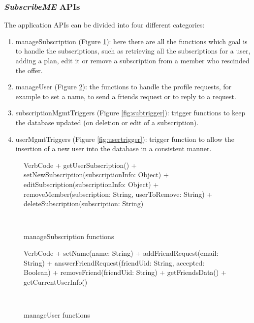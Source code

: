 \documentclass[11pt]{article}
\begin{document}
\subsubsection{\textit{SubscribeME} APIs}
The application APIs can be divided into four different categories: \begin{enumerate}
    \item manageSubscription (Figure \ref{fig:manageSub}): here there are all the functions which goal is to handle the subscriptions, such as retrieving all the subscriptions for a user, adding a plan, edit it or remove a subscription from a member who rescinded the offer.

    \item manageUser (Figure \ref{fig:manageUs}): the functions to handle the profile requests, for example to set a name, to send a friends request or to reply to a request.
    \item subscriptionMgmtTriggers (Figure \ref{fig:subtrigger}): trigger functions to keep the database updated (on deletion or edit of a subscription).
    \item userMgmtTriggers (Figure \ref{fig:usertrigger}): trigger function to allow the insertion of a new user into the database in a consistent manner.
\end{enumerate}

\begin{figure}[h!]
    \centering
    \begin{SaveVerbatim}{VerbCode}
        + getUserSubscription()
        + setNewSubscription(subscriptionInfo: Object{})
        + editSubscription(subscriptionInfo: Object{})
        + removeMember(subscription: String, userToRemove: String)
        + deleteSubscription(subscription: String)
    \end{SaveVerbatim}
    \setlength{\fboxsep}{5mm}
    \caption{manageSubscription functions}~\label{fig:manageSub}
\end{figure}

\begin{figure}[h!]
    \centering
    \begin{SaveVerbatim}{VerbCode}
        + setName(name: String)
        + addFriendRequest(email: String)
        + answerFriendRequest(friendUid: String, accepted: Boolean)
        + removeFriend(friendUid: String)
        + getFriendsData()
        + getCurrentUserInfo()
    \end{SaveVerbatim}
    \setlength{\fboxsep}{5mm}
    \caption{manageUser functions}~\label{fig:manageUs}
\end{figure}
\end{document}

